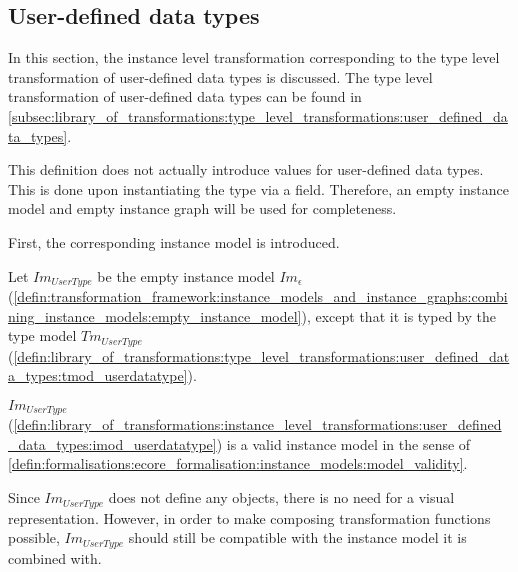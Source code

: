 \subsection{User-defined data types}
\label{subsec:library_of_transformations:instance_level_transformations:user_defined_data_types}

In this section, the instance level transformation corresponding to the type level transformation of user-defined data types is discussed. The type level transformation of user-defined data types can be found in \cref{subsec:library_of_transformations:type_level_transformations:user_defined_data_types}.

This definition does not actually introduce values for user-defined data types. This is done upon instantiating the type via a field. Therefore, an empty instance model and empty instance graph will be used for completeness.

First, the corresponding instance model is introduced.

\begin{defin}
\label{defin:library_of_transformations:instance_level_transformations:user_defined_data_types:imod_userdatatype}
Let $Im_{UserType}$ be the empty instance model $Im_\epsilon$ (\cref{defin:transformation_framework:instance_models_and_instance_graphs:combining_instance_models:empty_instance_model}), except that it is typed by the type model $Tm_{UserType}$ (\cref{defin:library_of_transformations:type_level_transformations:user_defined_data_types:tmod_userdatatype}).
\end{defin}

\begin{thm}
\label{defin:library_of_transformations:instance_level_transformations:user_defined_data_types:imod_userdatatype_correct}
$Im_{UserType}$ (\cref{defin:library_of_transformations:instance_level_transformations:user_defined_data_types:imod_userdatatype}) is a valid instance model in the sense of \cref{defin:formalisations:ecore_formalisation:instance_models:model_validity}.
\end{thm}

Since $Im_{UserType}$ does not define any objects, there is no need for a visual representation. However, in order to make composing transformation functions possible, $Im_{UserType}$ should still be compatible with the instance model it is combined with.

